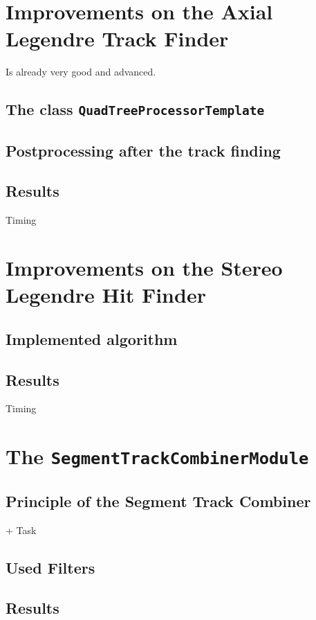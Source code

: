 \begin{figure}
  \caption{}
  \label{fig-result-background-hit-finder}
\end{figure}



\section{Improvements on the Axial Legendre Track Finder}
Is already very good and advanced. 

\subsection{The class \texttt{QuadTreeProcessorTemplate}}
\subsection{Postprocessing after the track finding}
\subsection{Results}
Timing

\section{Improvements on the Stereo Legendre Hit Finder}
\subsection{Implemented algorithm}
\subsection{Results}
Timing

\section{The \texttt{SegmentTrackCombinerModule}}
\subsection{Principle of the Segment Track Combiner}
+ Task
\subsection{Used Filters}
\subsection{Results}

